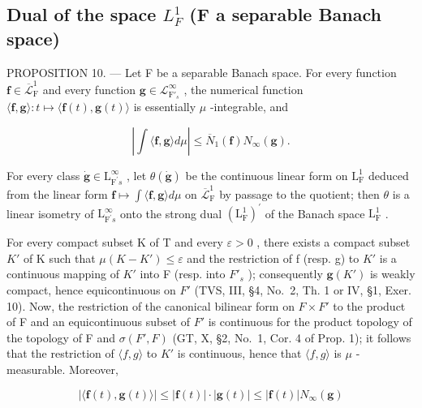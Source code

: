 \subsection{\texorpdfstring{Dual of the space \(L_{F}^{1}\) (F a separable Banach space)}{Dual of the space L sub F superscript 1 (F a separable Banach space)}}

PROPOSITION 10. --- Let F be a separable Banach space. For every function \(\mathbf{f} \in \overline{\mathcal{L}}_{\mathrm{F}}^{1}\) and every function \(\mathbf{g} \in \mathcal{L}_{\mathrm{F}'_s}^{\infty}\) , the numerical function \(\langle \mathbf{f}, \mathbf{g} \rangle : t \mapsto \langle \mathbf{f}(t), \mathbf{g}(t) \rangle\) is essentially \(\mu\) -integrable, and

\[
\left| \int \langle \mathbf {f}, \mathbf {g} \rangle d \mu \right| \leqslant \overline {{{{N}}}} _ {1} (\mathbf {f}) N _ {\infty} (\mathbf {g}).\tag{3}
\]

For every class \(\dot{\mathbf{g}}\in\mathrm{L}_{\mathrm{F}^{\prime}s}^{\infty}\) , let \(\theta(\dot{\mathbf{g}})\) be the continuous linear form on \(\mathrm{L}_{\mathrm{F}}^{1}\) deduced from the linear form \(\mathbf{f}\mapsto\int\langle\mathbf{f},\mathbf{g}\rangle d\mu\) on \(\overline{\mathcal{L}}_{\mathrm{F}}^{1}\) by passage to the quotient; then \(\theta\) is a linear isometry of \(\mathrm{L}_{\mathrm{F}^{\prime}s}^{\infty}\) onto the strong dual \((\mathrm{L}_{\mathrm{F}}^{1})^{\prime}\) of the Banach space \(\mathrm{L}_{\mathrm{F}}^{1}\) .

For every compact subset K of T and every \(\varepsilon > 0\) , there exists a compact subset \(K'\) of K such that \(\mu(K - K') \leqslant \varepsilon\) and the restriction of f (resp. g) to \(K'\) is a continuous mapping of \(K'\) into F (resp. into \(F'_s\) ); consequently \(\mathbf{g}(K')\) is weakly compact, hence equicontinuous on \(F'\) (TVS, III, §4, No.~2, Th. 1 or IV, §1, Exer. 10). Now, the restriction of the canonical bilinear form on \(F \times F'\) to the product of F and an equicontinuous subset of \(F'\) is continuous for the product topology of the topology of F and \(\sigma(F', F)\) (GT, X, §2, No.~1, Cor. 4 of Prop. 1); it follows that the restriction of \(\langle f, g \rangle\) to \(K'\) is continuous, hence that \(\langle f, g \rangle\) is \(\mu\) -measurable. Moreover,

\[
| \langle \mathbf {f} (t), \mathbf {g} (t) \rangle | \leqslant | \mathbf {f} (t) | \cdot | \mathbf {g} (t) | \leqslant | \mathbf {f} (t) | N _ {\infty} (\mathbf {g})
\]

